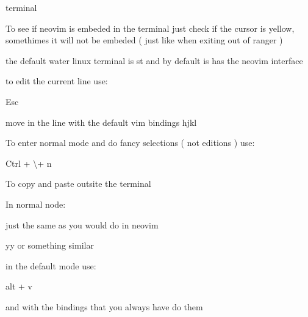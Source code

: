 \begin{section}{terminal}

	To see if neovim is embeded in the terminal just check if the cursor is yellow, somethimes it will not be embeded ( just like when exiting out of ranger )


	the default water linux terminal is st and by default is has the neovim interface

	to edit the current line use:

	\<Esc\>

	move in the line with the default vim bindings hjkl

	To enter normal mode and do fancy selections ( not editions ) use:

	\< Ctrl \> + \textbackslash + n

	To copy and paste outsite the terminal

	In normal node:

	just the same as you would do in neovim

	yy or something similar

	in the default mode use:

	alt + v

	and with the bindings that you always have do them



\end{section}
